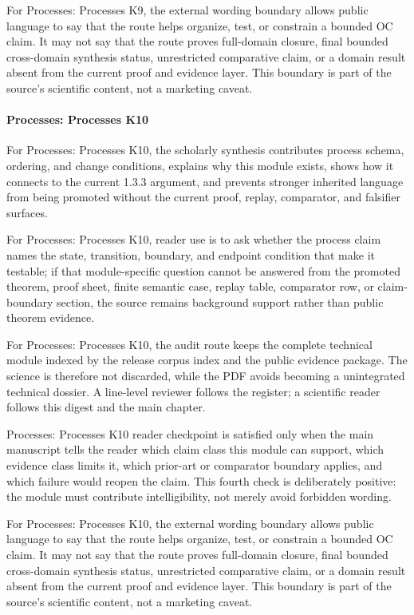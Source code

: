 For Processes: Processes K9, the external wording boundary allows public language to say that the route helps organize, test, or constrain a bounded OC claim. It may not say that the route proves full-domain closure, final bounded cross-domain synthesis status, unrestricted comparative claim, or a domain result absent from the current proof and evidence layer. This boundary is part of the source's scientific content, not a marketing caveat.


\paragraph{Processes: Processes K10}

For Processes: Processes K10, the scholarly synthesis contributes process schema, ordering, and change conditions, explains why this module exists, shows how it connects to the current 1.3.3 argument, and prevents stronger inherited language from being promoted without the current proof, replay, comparator, and falsifier surfaces.


For Processes: Processes K10, reader use is to ask whether the process claim names the state, transition, boundary, and endpoint condition that make it testable; if that module-specific question cannot be answered from the promoted theorem, proof sheet, finite semantic case, replay table, comparator row, or claim-boundary section, the source remains background support rather than public theorem evidence.


For Processes: Processes K10, the audit route keeps the complete technical module indexed by the release corpus index and the public evidence package. The science is therefore not discarded, while the PDF avoids becoming a unintegrated technical dossier. A line-level reviewer follows the register; a scientific reader follows this digest and the main chapter.


Processes: Processes K10 reader checkpoint is satisfied only when the main manuscript tells the reader which claim class this module can support, which evidence class limits it, which prior-art or comparator boundary applies, and which failure would reopen the claim. This fourth check is deliberately positive: the module must contribute intelligibility, not merely avoid forbidden wording.


For Processes: Processes K10, the external wording boundary allows public language to say that the route helps organize, test, or constrain a bounded OC claim. It may not say that the route proves full-domain closure, final bounded cross-domain synthesis status, unrestricted comparative claim, or a domain result absent from the current proof and evidence layer. This boundary is part of the source's scientific content, not a marketing caveat.


